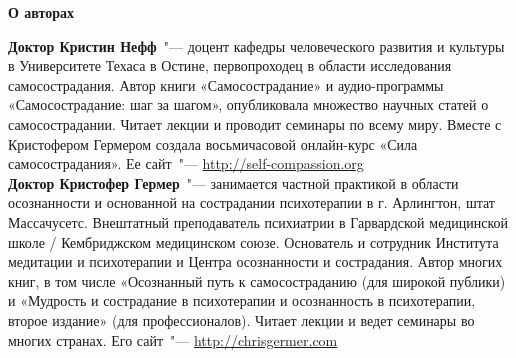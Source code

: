 
{\bf \Huge О авторах\\[2cm]}

{\bf Доктор Кристин Нефф}~"--- доцент кафедры человеческого развития и культуры в Университете Техаса в Остине, первопроходец в области исследования самосострадания. Автор книги «Самосострадание» и аудио-программы «Самосострадание: шаг за шагом», опубликовала множество научных статей о самосострадании. Читает лекции и проводит семинары по всему миру. Вместе с Кристофером Гермером создала восьмичасовой онлайн-курс «Сила самосострадания». Ее сайт~"--- \url{http://self-compassion.org}\\[1mm]
	
{\bf Доктор Кристофер Гермер}~"--- занимается частной практикой в области осознанности и основанной на сострадании психотерапии в г. Арлингтон, штат Массачусетс. Внештатный преподаватель психиатрии в Гарвардской медицинской школе / Кембриджском медицинском союзе. Основатель и сотрудник Института медитации и психотерапии и Центра осознанности и сострадания. Автор многих книг, в том числе «Осознанный путь к самосостраданию (для широкой публики) и «Мудрость и сострадание в психотерапии и осознанность в психотерапии, второе издание» (для профессионалов). Читает лекции и ведет семинары во многих странах. Его сайт~"--- \url{http://chrisgermer.com}
	